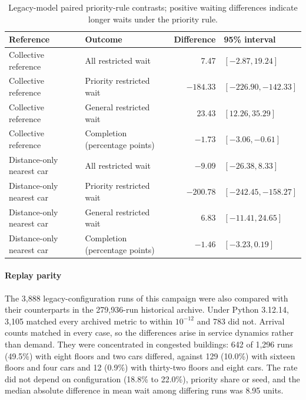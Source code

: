 \begin{table}[H]\centering
\caption{Legacy-model paired priority-rule contrasts; positive waiting differences indicate longer waits under the priority rule.}\label{tab:legacy-contrasts}
\small\begin{tabular}{@{}p{.28\linewidth}p{.30\linewidth}rp{.20\linewidth}@{}}
\toprule Reference & Outcome & Difference & 95\% interval\\\midrule
Collective reference & All restricted wait & 7.47 & $[-2.87, 19.24]$\\
Collective reference & Priority restricted wait & $-184.33$ & $[-226.90, -142.33]$\\
Collective reference & General restricted wait & 23.43 & $[12.26, 35.29]$\\
Collective reference & Completion (percentage points) & $-1.73$ & $[-3.06, -0.61]$\\
Distance-only nearest car & All restricted wait & $-9.09$ & $[-26.38, 8.33]$\\
Distance-only nearest car & Priority restricted wait & $-200.78$ & $[-242.45, -158.27]$\\
Distance-only nearest car & General restricted wait & 6.83 & $[-11.41, 24.65]$\\
Distance-only nearest car & Completion (percentage points) & $-1.46$ & $[-3.23, 0.19]$\\
\bottomrule
\end{tabular}
\end{table}

\paragraph{Replay parity} The 3,888 legacy-configuration runs of this campaign were also compared with their counterparts in the 279,936-run historical archive. Under Python 3.12.14, 3,105 matched every archived metric to within $10^{-12}$ and 783 did not. Arrival counts matched in every case, so the differences arise in service dynamics rather than demand. They were concentrated in congested buildings: 642 of 1,296 runs (49.5\%) with eight floors and two cars differed, against 129 (10.0\%) with sixteen floors and four cars and 12 (0.9\%) with thirty-two floors and eight cars. The rate did not depend on configuration (18.8\% to 22.0\%), priority share or seed, and the median absolute difference in mean wait among differing runs was 8.95 units.

